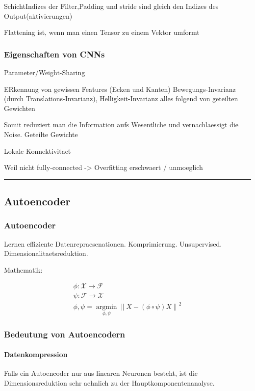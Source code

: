 \documentclass[../main]{subfiles}
\begin{document}
SchichtIndizes der Filter,Padding und stride sind gleich den Indizes des Output(aktivierungen)


Flattening ist, wenn man einen Tensor zu einem Vektor umformt
\subsubsection{Eigenschaften von CNNs}
Parameter/Weight-Sharing

ERkennung von gewissen Features (Ecken und Kanten)
Bewegungs-Invarianz (durch Translations-Invarianz), Helligkeit-Invarianz
alles folgend von geteilten Gewichten

Somit reduziert man die Information aufs Wesentliche und vernachlaessigt die Noise.
Geteilte Gewichte

Lokale Konnektivitaet

Weil nicht fully-connected -> Overfitting erschwaert / unmoeglich

\noindent\rule{\textwidth}{10pt}

\pagebreak
\subsection{Autoencoder}

\subsubsection{Autoencoder}
Lernen effiziente Datenrepraesenationen. Komprimierung. Unsupervised.
Dimensionalitaetsreduktion.

Mathematik:


\begin{gather}
  \phi: \mathcal{X} \to \mathcal{F}\\
  \psi: \mathcal{F} \to \mathcal{X}\\
  \displaystyle\phi,\psi = \operatorname*{\arg \min}_{\phi,\psi} \parallel {X - (\phi \circ \psi)X \parallel}^2
\end{gather}

\subsubsection{Bedeutung von Autoencodern}
\paragraph{Datenkompression}
Falls ein Autoencoder nur aus linearen Neuronen besteht, ist die
Dimensionsreduktion sehr aehnlich zu der Hauptkomponentenanalyse.
\end{document}
